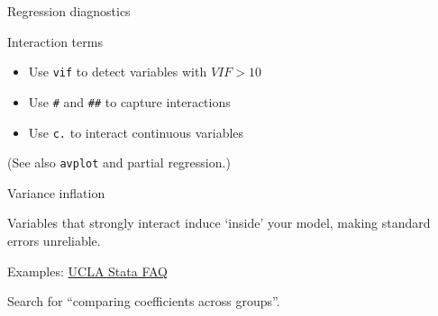 \documentclass[t]{beamer}
\begin{document}
	\begin{frame}[t]{Regression diagnostics}

		\begin{block}{Interaction terms}

			\begin{itemize}
				\item Use \texttt{vif} to detect variables with $VIF > 10$
				\item Use \texttt{\#} and \texttt{\#\#} to capture interactions
				\item Use \texttt{c.} to interact continuous variables
			\end{itemize}
			
			(See also \texttt{avplot} and partial regression.)
		\end{block}

		\begin{alertblock}{Variance inflation}

			Variables that strongly interact induce  `inside' your model, making standard errors unreliable.

		\end{alertblock}

		\begin{exampleblock}{Examples: \href{http://www.ats.ucla.edu/stat/stata/faq/}{UCLA Stata FAQ}}

			Search for ``comparing coefficients across groups''.

		\end{exampleblock}
					
	\end{frame}

\end{document}
